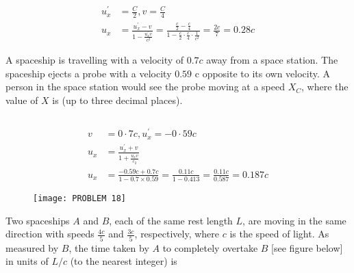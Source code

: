 \begin{enumerate}
\begin{minipage}{\textwidth}
\end{minipage}
\begin{answer}
	\begin{align*}
	u_{x}^{\prime}&=\frac{C}{2}, v=\frac{C}{4}\\
	u_{x}&=\frac{u_{x}^{\prime}-v}{1-\frac{u_{x}^{\prime} v}{c^{2}}}=\frac{\frac{c}{2}-\frac{c}{4}}{1-\frac{c}{2} \cdot \frac{c}{4} \cdot \frac{1}{c^{2}}}=\frac{2 c}{7}=0.28 c
	\end{align*}
\end{answer}
\begin{minipage}{\textwidth}
	\item A spaceship is travelling with a velocity of $0.7 c$ away from a space station. The spaceship ejects a probe with a velocity $0.59$ c opposite to its own velocity. A person in the space station would see the probe moving at a speed $X_{C}$, where the value of $X$ is (up to three decimal places).
\end{minipage}
\begin{answer}$\left. \right. $\\
	\begin{minipage}{0.5\textwidth}
	\begin{align*}
	v&=0 \cdot 7 c, u_{x}^{\prime}=-0 \cdot 59 c\\
	u_{x}&=\frac{u_{x}^{\prime}+v}{1+\frac{u_{x}^{\prime} v}{c_{2}}}\\
	u_{x}&=\frac{-0.59 c+0.7 c}{1-0.7 \times 0.59}=\frac{0.11 c}{1-0.413}=\frac{0.11 c}{0.587}=0.187 c
	\end{align*}
	\end{minipage}
\begin{minipage}{0.5\textwidth}
\begin{figure}[H]
	\centering
	\texttt{[image: PROBLEM 18]}
\end{figure}		
\end{minipage}
\end{answer}
\begin{minipage}{\textwidth}
	\item Two spaceships $A$ and $B$, each of the same rest length $L$, are moving in the same direction with speeds $\frac{4 c}{5}$ and $\frac{3 c}{5}$, respectively, where $c$ is the speed of light. As measured by $B$, the time taken by $A$ to completely overtake $B$ [see figure below] in units of $L / c$ (to the nearest integer) is
	$\left. \right. $\\
	\begin{minipage}{0.5\textwidth}

\end{minipage}
\end{minipage}
\end{enumerate}

